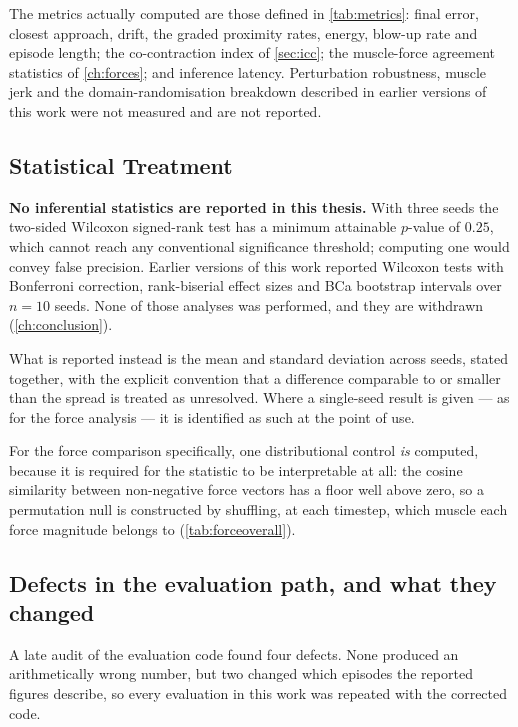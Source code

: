 The metrics actually computed are those defined in \cref{tab:metrics}: final
error, closest approach, drift, the graded proximity rates, energy, blow-up rate
and episode length; the co-contraction index of \cref{sec:icc}; the muscle-force
agreement statistics of \cref{ch:forces}; and inference latency. Perturbation
robustness, muscle jerk and the domain-randomisation breakdown described in
earlier versions of this work were not measured and are not reported.

\subsection{Statistical Treatment}
\label{sec:stats_protocol}

\textbf{No inferential statistics are reported in this thesis.} With three seeds
the two-sided Wilcoxon signed-rank test has a minimum attainable $p$-value of
$0.25$, which cannot reach any conventional significance threshold; computing one
would convey false precision. Earlier versions of this work reported Wilcoxon
tests with Bonferroni correction, rank-biserial effect sizes and BCa bootstrap
intervals over $n=10$ seeds. None of those analyses was performed, and they are
withdrawn (\cref{ch:conclusion}).

What is reported instead is the mean and standard deviation across seeds, stated
together, with the explicit convention that a difference comparable to or smaller
than the spread is treated as unresolved. Where a single-seed result is given ---
as for the force analysis --- it is identified as such at the point of use.

For the force comparison specifically, one distributional control \emph{is}
computed, because it is required for the statistic to be interpretable at all:
the cosine similarity between non-negative force vectors has a floor well above
zero, so a permutation null is constructed by shuffling, at each timestep, which
muscle each force magnitude belongs to (\cref{tab:forceoverall}).


\subsection{Defects in the evaluation path, and what they changed}
\label{sec:evaldefects}

A late audit of the evaluation code found four defects. None produced an
arithmetically wrong number, but two changed which episodes the reported figures
describe, so every evaluation in this work was repeated with the corrected code.

